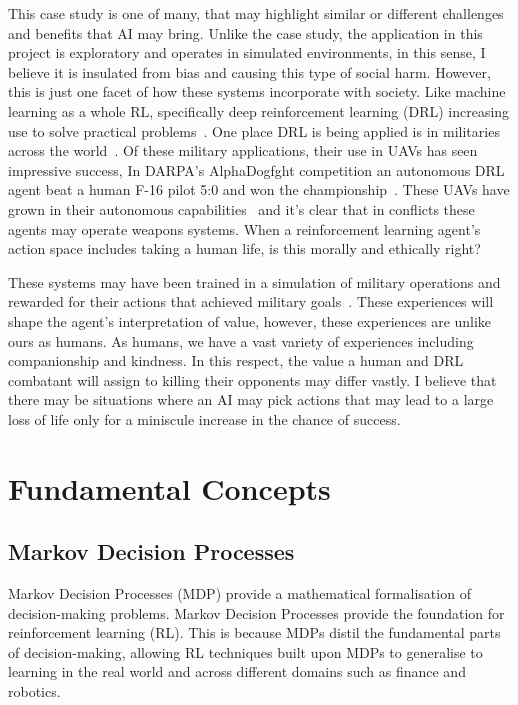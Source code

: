 \documentclass[]{final_report}
\begin{document}
This case study is one of many, that may highlight similar or different challenges and benefits that AI may bring. Unlike the case study, the application in this project is exploratory and operates in simulated environments, in this sense, I believe it is insulated from bias and causing this type of social harm. However, this is just one facet of how these systems incorporate with society. Like machine learning as a whole RL, specifically deep reinforcement learning (DRL) increasing use to solve practical problems~\cite{deepRLsocietalImpact}. One place DRL is being applied is in militaries across the world~\cite{rlMilitaryReviewChina}\cite{DRLDrones}. Of these military applications, their use in UAVs has seen impressive success, In DARPA's AlphaDogfght competition an autonomous DRL agent beat a human F-16 pilot 5:0 and won the championship~\cite{rlMilitaryReviewChina}. These UAVs have grown in their autonomous capabilities~\cite{DRLDrones} and it's clear that in conflicts these agents may operate weapons systems. When a reinforcement learning agent's action space includes taking a human life, is this morally and ethically right?

These systems may have been trained in a simulation of military operations and rewarded for their actions that achieved military goals~\cite{rlMilitaryReviewChina}. These experiences will shape the agent's interpretation of value, however, these experiences are unlike ours as humans. As humans, we have a vast variety of experiences including companionship and kindness. In this respect, the value a human and DRL combatant will assign to killing their opponents may differ vastly. I believe that there may be situations where an AI may pick actions that may lead to a large loss of life only for a miniscule increase in the chance of success. 

\chapter{Fundamental Concepts}
\section{Markov Decision Processes}

Markov Decision Processes (MDP) provide a mathematical formalisation of decision-making problems. Markov Decision Processes provide the foundation for reinforcement learning (RL). This is because MDPs distil the fundamental parts of decision-making, allowing RL techniques built upon MDPs to generalise to learning in the real world and across different domains such as finance and robotics. 
\end{document}
